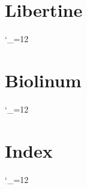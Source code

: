 \documentclass[ngerman]{libertinedoku}
\begin{document}

\section{Libertine}

{%
\setlength{\columnseprule}{.5pt}
\setlength{\columnsep}{1cm}
\begin{multicols}{3}
   \renewcommand*\DeclareTextGlyphX[5]{\index{#4 (Libertine)}%
   \makebox[3cm][l]{%
   \texttt{#4}}\hfill%
   {\Huge\fbox{\libertineGlyph{#4}\strut}}\hfill\mbox{}\newline}
   \catcode`\_=12%
\end{multicols}
}

\newpage
\section{Biolinum}

{%
\setlength{\columnseprule}{.5pt}
\setlength{\columnsep}{1cm}
\begin{multicols}{3}
   \renewcommand*\DeclareTextGlyphX[5]{\index{#4 (Biolinum)}%
   \makebox[3cm][l]{%
   \texttt{#4}}\hfill%
   {\Huge\fbox{\libertineGlyph{#4}\strut}}\hfill\mbox{}\newline}
   \catcode`\_=12%
\end{multicols}
}

\section{Index}

{%
\catcode`\_=12%
\def\indexcolumn{3}
\printindex
}
\end{document}
